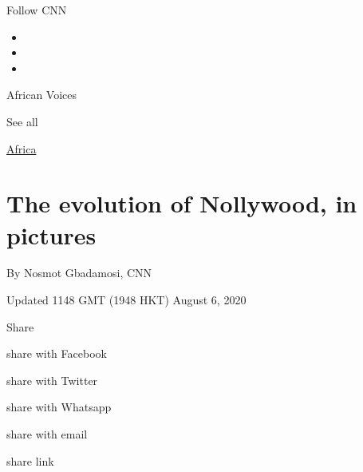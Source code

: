 Follow CNN

\begin{itemize}
\item
\item
\item
\end{itemize}

\href{/specials/africa/african-voices}{}

African Voices

See all

\href{/africa}{Africa}

\hypertarget{the-evolution-of-nollywood-in-pictures}{%
\section{The evolution of Nollywood, in
pictures}\label{the-evolution-of-nollywood-in-pictures}}

By Nosmot Gbadamosi, CNN

Updated 1148 GMT (1948 HKT) August 6, 2020

Share

share with Facebook

share with Twitter

share with Whatsapp

share with email

share link

